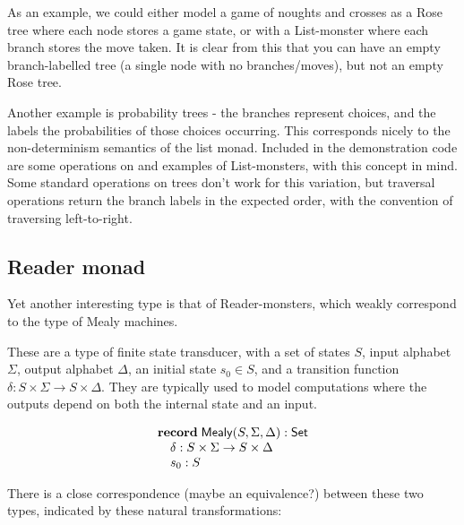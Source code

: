 \documentclass{article}
\begin{document}
As an example, we could either model a game of noughts and crosses as a Rose tree where each node stores a game state, or with a List-monster where each branch stores the move taken. It is clear from this that you can have an empty branch-labelled tree (a single node with no branches/moves), but not an empty Rose tree.

Another example is probability trees - the branches represent choices, and the labels the probabilities of those choices occurring. This corresponds nicely to the non-determinism semantics of the list monad. Included in the demonstration code are some operations on and examples of List-monsters, with this concept in mind. \\

Some standard operations on trees don't work for this variation, but traversal operations return the branch labels in the expected order, with the convention of traversing left-to-right. 

\subsection{Reader monad}

Yet another interesting type is that of Reader-monsters, which weakly correspond to the type of Mealy machines. 

These are a type of finite state transducer, with a set of states $S$, input alphabet $\Sigma$, output alphabet $\Delta$, an initial state $s_0 \in S$, and a transition function $\delta : S \times \Sigma \to S \times \Delta$. They are typically used to model computations where the outputs depend on both the internal state and an input.

$$
\begin{array}[t]{l}
\mathbf{record}\;
\mathsf{Mealy}(S,\Sigma,\Delta):\mathsf{Set}\\
\quad \delta : S \times \Sigma \to S \times \Delta \\
\quad s_0 : S
\end{array}
$$

There is a close correspondence (maybe an equivalence?) between these two types, indicated by these natural transformations:
\end{document}
